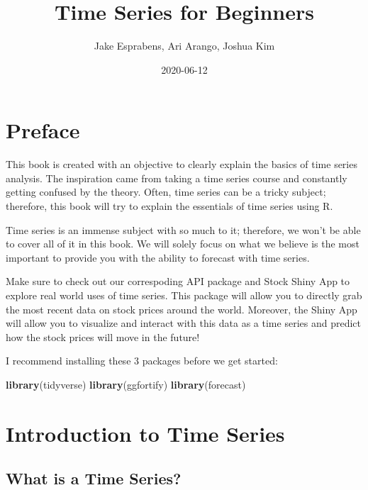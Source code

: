 \documentclass[
]{book}
\title{Time Series for Beginners}
\author{Jake Esprabens, Ari Arango, Joshua Kim}
\date{2020-06-12}
\newenvironment{Shaded}{\begin{snugshade}}{\end{snugshade}}
\newcommand{\KeywordTok}[1]{\textcolor[rgb]{0.13,0.29,0.53}{\textbf{#1}}}
\newcommand{\NormalTok}[1]{#1}
\begin{document}
\maketitle

{
\setcounter{tocdepth}{1}
\tableofcontents
}
\hypertarget{preface}{%
\chapter*{Preface}\label{preface}}

This book is created with an objective to clearly explain the basics of time series analysis. The inspiration came from taking a time series course and constantly getting confused by the theory. Often, time series can be a tricky subject; therefore, this book will try to explain the essentials of time series using R.

Time series is an immense subject with so much to it; therefore, we won't be able to cover all of it in this book. We will solely focus on what we believe is the most important to provide you with the ability to forecast with time series.

Make sure to check out our correspoding API package and Stock Shiny App to explore real world uses of time series. This package will allow you to directly grab the most recent data on stock prices around the world. Moreover, the Shiny App will allow you to visualize and interact with this data as a time series and predict how the stock prices will move in the future!

I recommend installing these 3 packages before we get started:

\begin{Shaded}
\begin{Highlighting}[]
\KeywordTok{library}\NormalTok{(tidyverse)}
\KeywordTok{library}\NormalTok{(ggfortify)}
\KeywordTok{library}\NormalTok{(forecast)}
\end{Highlighting}
\end{Shaded}

\hypertarget{introduction-to-time-series}{%
\chapter{Introduction to Time Series}\label{introduction-to-time-series}}

\hypertarget{what-is-a-time-series}{%
\section{What is a Time Series?}\label{what-is-a-time-series}}
\end{document}
